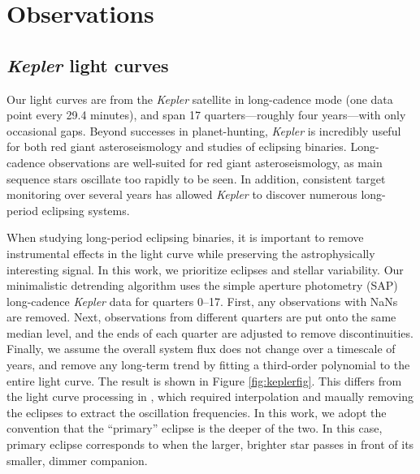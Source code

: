 \section{Observations}\label{data}

\subsection{\emph{Kepler} light curves}\label{kepler}
Our light curves are from the \emph{Kepler} satellite in long-cadence mode (one data point every 29.4 minutes), and span 17 quarters---roughly four years---with only occasional gaps. Beyond successes in planet-hunting, \emph{Kepler} is incredibly useful for both red giant asteroseismology and studies of eclipsing binaries. Long-cadence observations are well-suited for red giant asteroseismology, as main sequence stars oscillate too rapidly to be seen. In addition, consistent target monitoring over several years has allowed \emph{Kepler} to discover numerous long-period eclipsing systems.

When studying long-period eclipsing binaries, it is important to remove instrumental effects in the light curve while preserving the astrophysically interesting signal. In this work, we prioritize eclipses and stellar variability. Our minimalistic detrending algorithm uses the simple aperture photometry (SAP) long-cadence \emph{Kepler} data for quarters 0--17. First, any observations with NaNs are removed. Next, observations from different quarters are put onto the same median level, and the ends of each quarter are adjusted to remove discontinuities. Finally, we assume the overall system flux does not change over a timescale of years, and remove any long-term trend by fitting a third-order polynomial to the entire light curve. The result is shown in Figure \ref{fig:keplerfig}. This differs from the light curve processing in \citet{gau14}, which required interpolation and maually removing the eclipses to extract the oscillation frequencies. In this work, we adopt the convention that the ``primary'' eclipse is the deeper of the two. In this case, primary eclipse corresponds to when the larger, brighter star passes in front of its smaller, dimmer companion.
